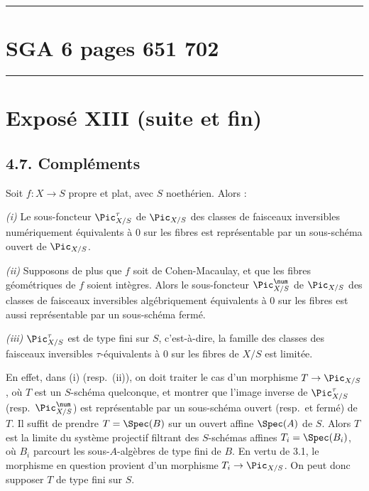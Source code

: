 \begin{center}
\rule{0.5\textwidth}{0.4pt}
\end{center}


\clearpage
{}
\section*{SGA 6 pages 651 702}
\setcounter{page}{651}

\thispagestyle{fancy}

\noindent\rule{\textwidth}{0.5pt}


\section*{Expos\'e XIII (suite et fin)}

\setcounter{section}{4}
\setcounter{subsection}{0}

\subsection*{4.7. Compl\'ements}

\begin{theoreme}[4.7]
Soit $f : X \to S$ propre et plat, avec $S$ noeth\'erien. Alors :

\emph{(i)} Le sous-foncteur $\Pic^{\tau}_{X/S}$ de $\Pic_{X/S}$ des classes de faisceaux inversibles num\'eriquement \'equivalents \`a $0$ sur les fibres est repr\'esentable par un sous-sch\'ema ouvert de $\Pic_{X/S}$.

\emph{(ii)} Supposons de plus que $f$ soit de Cohen-Macaulay, et que les fibres g\'eom\'etriques de $f$ soient int\`egres. Alors le sous-foncteur $\Pic^{\num}_{X/S}$ de $\Pic_{X/S}$ des classes de faisceaux inversibles alg\'ebriquement \'equivalents \`a $0$ sur les fibres est aussi repr\'esentable par un sous-sch\'ema ferm\'e.

\emph{(iii)} $\Pic^{\tau}_{X/S}$ est de type fini sur $S$, c'est-\`a-dire, la famille des classes des faisceaux inversibles $\tau$-\'equivalents \`a $0$ sur les fibres de $X/S$ est limit\'ee.
\end{theoreme}

En effet, dans (i) (resp.\ (ii)), on doit traiter le cas d'un morphisme $T \to \Pic_{X/S}$, o\`u $T$ est un $S$-sch\'ema quelconque, et montrer que l'image inverse de $\Pic^{\tau}_{X/S}$ (resp.\ $\Pic^{\num}_{X/S}$) est repr\'esentable par un sous-sch\'ema ouvert (resp.\ et ferm\'e) de $T$. Il suffit de prendre $T = \Spec(B)$ sur un ouvert affine $\Spec(A)$ de $S$. Alors $T$ est la limite du syst\`eme projectif filtrant des $S$-sch\'emas affines $T_i = \Spec(B_i)$, o\`u $B_i$ parcourt les sous-$A$-alg\`ebres de type fini de $B$. En vertu de 3.1, le morphisme en question provient d'un morphisme $T_i \to \Pic_{X/S}$. On peut donc supposer $T$ de type fini sur $S$.

